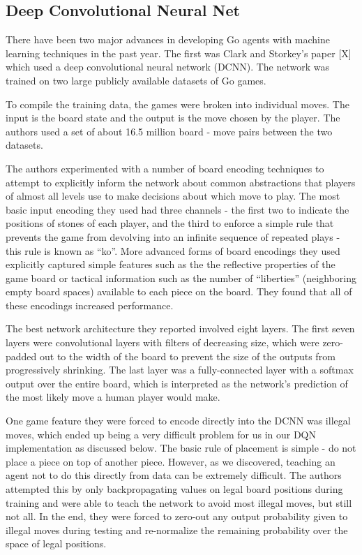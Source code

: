 \subsection{Deep Convolutional Neural Net}
There have been two major advances in developing Go agents with machine learning techniques in the past year. The first was Clark and Storkey's paper [X] which used a deep convolutional neural network (DCNN). The network was trained on two large publicly available datasets of Go games.

To compile the training data, the games were broken into individual moves. The input is the board state and the output is the move chosen by the player. The authors used a set of about 16.5 million board - move pairs between the two datasets.

The authors experimented with a number of board encoding techniques to attempt to explicitly inform the network about common abstractions that players of almost all levels use to make decisions about which move to play. The most basic input encoding they used had three channels - the first two to indicate the positions of stones of each player, and the third to enforce a simple rule that prevents the game from devolving into an infinite sequence of repeated plays - this rule is known as ``ko''. More advanced forms of board encodings they used explicitly captured simple features such as the the reflective properties of the game board or tactical information such as the number of ``liberties'' (neighboring empty board spaces) available to each piece on the board. They found that all of these encodings increased performance.

The best network architecture they reported involved eight layers. The first seven layers were convolutional layers with filters of decreasing size, which were zero-padded out to the width of the board to prevent the size of the outputs from progressively shrinking. The last layer was a fully-connected layer with a softmax output over the entire board, which is interpreted as the network's prediction of the most likely move a human player would make.

One game feature they were forced to encode directly into the DCNN was illegal moves, which ended up being a very difficult problem for us in our DQN implementation as discussed below. The basic rule of placement is simple - do not place a piece on top of another piece. However, as we discovered, teaching an agent not to do this directly from data can be extremely difficult. The authors attempted this by only backpropagating values on legal board positions during training and were able to teach the network to avoid most illegal moves, but still not all. In the end, they were forced to zero-out any output probability given to illegal moves during testing and re-normalize the remaining probability over the space of legal positions.

